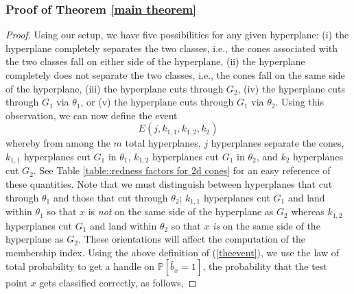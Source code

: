 \documentclass[twoside,11pt]{article}
\newcommand{\edit}[1]{{{#1}}}
\begin{document}
\subsubsection{Proof of Theorem \ref{main theorem}}

\begin{proof}
Using our setup, we have five possibilities for any given hyperplane: (i) the hyperplane completely separates the two classes, i.e., the cones associated with the two classes fall on either side of the hyperplane, (ii) the hyperplane completely does not separate the two classes, i.e.,  the cones fall on the same side of the hyperplane, (iii) the hyperplane cuts through $G_2$, (iv) the hyperplane cuts through $G_1$ via $\theta_1$, or (v) the hyperplane cuts through $G_1$ via $\theta_2$. Using this observation, we can now define the event 
%
\begin{equation}\label{theevent}
E( j,k_{1,1},k_{1,2},k_2 )
\end{equation} 
%
whereby from among the $m$ total hyperplanes, $j$ 
hyperplanes  separate the cones, $k_{1,1}$ hyperplanes  cut  $G_1$ in  $\theta_1$, $k_{1,2}$ hyperplanes cut  $G_1$  in  $\theta_2$, and  $k_2$ hyperplanes cut  $G_2$. 
See Table \ref{table::redness factors for 2d cones} for an easy reference of these quantities. Note that we must distinguish between hyperplanes that cut through $\theta_1$ and those that cut through $\theta_2$; $k_{1,1}$ hyperplanes cut $G_1$ and land within $\theta_1$ so that $x$ is \textit{not} on the same side of the hyperplane as $G_2$ whereas $k_{1,2}$ hyperplanes cut $G_1$ and land within $\theta_2$ so that $x$ \textit{is} on the same side of the hyperplane as $G_2$. These orientations will affect the computation of the membership index. Using the above definition of (\ref{theevent}), we use the law of total probability to get a handle on $\mathbb{P}[\widehat{b}_x = 1]$, the probability that the test point $x$ gets classified correctly, as follows,


\end{proof}
\end{document}

